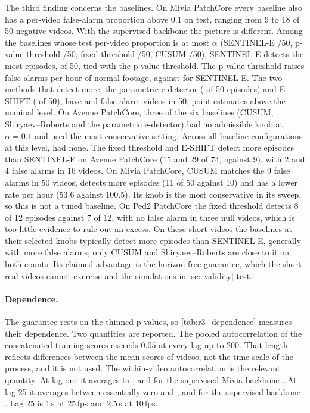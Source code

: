 The third finding concerns the baselines. On Mivia PatchCore every baseline also has a per-video false-alarm proportion above $0.1$ on test, ranging from 9 to 18 of 50 negative videos. With the supervised backbone the picture is different. Among the baselines whose test per-video proportion is at most $\alpha$ (SENTINEL-E \RThreeSupSEFAk{}/50, p-value threshold \RThreeSupPValueFAk{}/50, fixed threshold \RThreeSupFixedFAk{}/50, CUSUM \RThreeSupCUSUMFAk{}/50), SENTINEL-E detects the most episodes, \RThreeSupSEDetk{} of 50, tied with the p-value threshold. The p-value threshold raises \RThreeSupPValueFAhrP{} false alarms per hour of normal footage, against \RThreeSupSEFAhrP{} for SENTINEL-E. The two methods that detect more, the parametric e-detector (\RThreeSupParamDetk{} of 50 episodes) and E-SHIFT (\RThreeSupEShiftDetk{} of 50), have \RThreeSupParamFAk{} and \RThreeSupEShiftFAk{} false-alarm videos in 50, point estimates above the nominal level. On Avenue PatchCore, three of the six baselines (CUSUM, Shiryaev--Roberts and the parametric e-detector) had no admissible knob at $\alpha=0.1$ and used the most conservative setting. Across all \RThreeBaselineConfigs{} baseline configurations at this level, \RThreeBaselineNoKnob{} had none. The fixed threshold and E-SHIFT detect more episodes than SENTINEL-E on Avenue PatchCore (15 and 29 of 74, against 9), with 2 and 4 false alarms in 16 videos. On Mivia PatchCore, CUSUM matches the 9 false alarms in 50 videos, detects more episodes (11 of 50 against 10) and has a lower rate per hour (53.6 against 100.5). Its knob is the most conservative in its sweep, so this is not a tuned baseline. On Ped2 PatchCore the fixed threshold detects 8 of 12 episodes against 7 of 12, with no false alarm in three null videos, which is too little evidence to rule out an excess. On these short videos the baselines at their selected knobs typically detect more episodes than SENTINEL-E, generally with more false alarms; only CUSUM and Shiryaev--Roberts are close to it on both counts. Its claimed advantage is the horizon-free guarantee, which the short real videos cannot exercise and the simulations in \cref{sec:validity} test.

\paragraph{Dependence.} The guarantee rests on the thinned p-values, so
\cref{tab:r3_dependence} measures their dependence. Two quantities are
reported. The pooled autocorrelation of the concatenated training scores
exceeds $0.05$ at every lag up to 200. That length reflects differences
between the mean scores of videos, not the time scale of the process, and
it is not used. The within-video autocorrelation is the relevant quantity. At
lag one it averages \RThreeWithinLagOneMin{} to \RThreeWithinLagOneMax{}, and for the
supervised Mivia backbone \RThreeMiviaSupWithinLagOne{}. At lag 25 it averages between
essentially zero and \RThreeWithinLagTwentyFiveMax{}, and for the supervised backbone
\RThreeMiviaSupWithinLagTwentyFive{}. Lag 25 is 1\,s at 25\,fps and 2.5\,s at 10\,fps.

